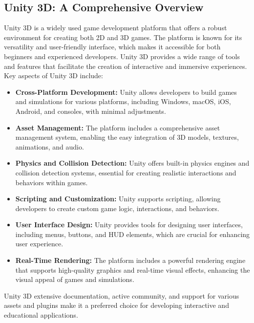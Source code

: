 \subsection*{Unity 3D: A Comprehensive Overview}
Unity 3D is a widely used game development platform that offers a robust environment for creating both 2D and 3D games. The platform is known for its versatility and user-friendly interface, which makes it accessible for both beginners and experienced developers. Unity 3D provides a wide range of tools and features that facilitate the creation of interactive and immersive experiences. Key aspects of Unity 3D include:
\begin{itemize}
    \item \textbf{Cross-Platform Development:} Unity allows developers to build games and simulations for various platforms, including Windows, macOS, iOS, Android, and consoles, with minimal adjustments.
    
    \item \textbf{Asset Management:} The platform includes a comprehensive asset management system, enabling the easy integration of 3D models, textures, animations, and audio.
    
    \item \textbf{Physics and Collision Detection:} Unity offers built-in physics engines and collision detection systems, essential for creating realistic interactions and behaviors within games.
    
    \item \textbf{Scripting and Customization:} Unity supports scripting, allowing developers to create custom game logic, interactions, and behaviors.
    
    \item \textbf{User Interface Design:} Unity provides tools for designing user interfaces, including menus, buttons, and HUD elements, which are crucial for enhancing user experience.
    
    \item \textbf{Real-Time Rendering:} The platform includes a powerful rendering engine that supports high-quality graphics and real-time visual effects, enhancing the visual appeal of games and simulations.
\end{itemize}
Unity 3D extensive documentation, active community, and support for various assets and plugins make it a preferred choice for developing interactive and educational applications.\cite{johnson2021unity}
